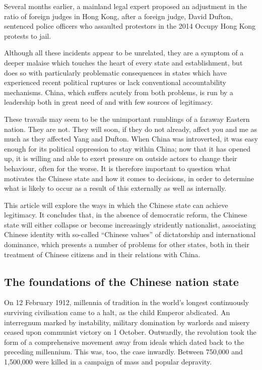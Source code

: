 	Several months earlier, a mainland legal expert proposed an adjustment in the ratio of foreign judges in Hong Kong, after a foreign judge, David Dufton, sentenced police officers who assaulted protestors in the 2014 Occupy Hong Kong protests to jail.

	Although all these incidents appear to be unrelated, they are a symptom of a deeper malaise which touches the heart of every state and establishment, but does so with particularly problematic consequences in states which have experienced recent political ruptures or lack conventional accountability mechanisms. China, which suffers acutely from both problems, is run by a leadership both in great need of and with few sources of legitimacy.

	These travails may seem to be the unimportant rumblings of a faraway Eastern nation. They are not. They will soon, if they do not already, affect you and me as much as they affected Yang and Dufton. When China was introverted, it was easy enough for its political oppression to stay within China; now that it has opened up, it is willing and able to exert pressure on outside actors to change their behaviour, often for the worse. It is therefore important to question what motivates the Chinese state and how it comes to decisions, in order to determine what is likely to occur as a result of this externally as well as internally.

	This article will explore the ways in which the Chinese state can achieve legitimacy. It concludes that, in the absence of democratic reform, the Chinese state will either collapse or become increasingly stridently nationalist, associating Chinese identity with so-called ``Chinese values'' of dictatorship and international dominance, which presents a number of problems for other states, both in their treatment of Chinese citizens and in their relations with China.


\subsection{The foundations of the Chinese nation state}


	On 12 February 1912, millennia of tradition in the world’s longest continuously surviving civilisation came to a halt, as the child Emperor abdicated. An interregnum marked by instability, military domination by warlords and misery ceased upon communist victory on 1 October. Outwardly, the revolution took the form of a comprehensive movement away from ideals which dated back to the preceding millennium. This was, too, the case inwardly. Between 750,000 and 1,500,000 were killed in a campaign of mass and popular depravity.

